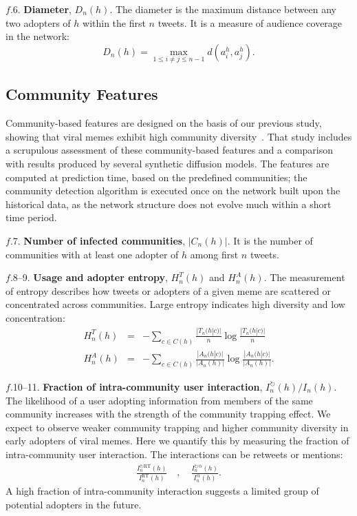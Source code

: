 \documentclass[letterpaper]{article}
\begin{document}
\noindent $f$.6. \textbf{Diameter}, $D_n(h)$.  The diameter is the maximum
distance between any two adopters of $h$ within the first $n$ tweets.
It is a measure of audience coverage in the network:
\begin{equation*}
D_n(h) = \max_{1 \leq i \neq j \leq n-1} d(a_i^h, a_j^h).
\end{equation*}



\subsection{Community Features}

Community-based features are designed on the basis of our previous study, showing that viral memes exhibit high community diversity~\cite{colbaugh2012early,weng2013viral}. That study includes a scrupulous assessment of these community-based features and a comparison with results produced by several synthetic diffusion models.
The features are computed at prediction time, based on the predefined communities; the community detection algorithm is executed once on the network built upon the historical data, as the network structure does not evolve much within a short time period.


\noindent $f$.7. \textbf{Number of infected communities}, $|C_n(h)|$.  It is the number of communities with at least one adopter of $h$ among first $n$ tweets.










\noindent $f$.8--9. \textbf{Usage and adopter entropy}, $H_n^T(h)$ and $H_n^A(h)$.
The measurement of entropy describes how  tweets or adopters of a
given meme are scattered or concentrated across communities. Large entropy indicates high
diversity and low concentration:
\begin{eqnarray*}
H_n^T(h) & = & -\sum_{c \in C(h)} \frac{|T_n(h|c)|}{n} \log
\frac{|T_n(h|c)|}{n} \\
H_n^A(h) & = & -\sum_{c \in C(h)} \frac{|A_n(h|c)|}{|A_n(h)|} \log
\frac{|A_n(h|c)|}{|A_n(h)|}.
\end{eqnarray*}


\noindent $f$.10--11. \textbf{Fraction of intra-community user interaction},
$I_n^{\circlearrowright}(h)/I_n(h)$.  The likelihood of a user adopting information
from members of the same community increases with the strength of the community
trapping effect. We expect to observe weaker community trapping and higher
community diversity in early adopters of viral memes.  Here we quantify this by
measuring the fraction of intra-community user interaction. The interactions
can be retweets or mentions:
\begin{eqnarray*}
\frac{I^{\circlearrowright\mathrm{RT}}_n(h)}{I^\mathrm{RT}_n(h)} \quad , \quad
\frac{I^{\circlearrowright\mathrm{@}}_n(h)}{I^\mathrm{@}_n(h)}.
\end{eqnarray*}
A high fraction of intra-community interaction suggests a limited group of potential adopters in the future. %
\end{document}
